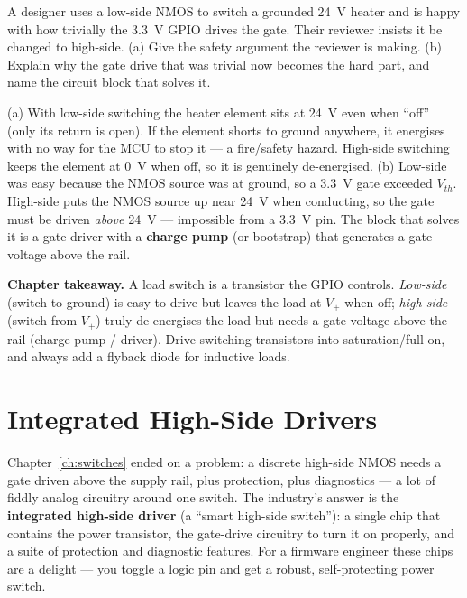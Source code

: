 \documentclass[11pt,a4paper,oneside]{book}
\begin{document}
\begin{exercise}
A designer uses a low-side NMOS to switch a grounded \qty{24}{\volt} heater and
is happy with how trivially the \qty{3.3}{\volt} GPIO drives the gate. Their
reviewer insists it be changed to high-side. (a) Give the safety argument the
reviewer is making. (b) Explain why the gate drive that was trivial now becomes
the hard part, and name the circuit block that solves it.
\end{exercise}
\begin{solution}
(a) With low-side switching the heater element sits at \qty{24}{\volt} even when
``off'' (only its return is open). If the element shorts to ground anywhere, it
energises with no way for the MCU to stop it --- a fire/safety hazard. High-side
switching keeps the element at \qty{0}{\volt} when off, so it is genuinely
de-energised. (b) Low-side was easy because the NMOS source was at ground, so a
\qty{3.3}{\volt} gate exceeded $V_{th}$. High-side puts the NMOS source up near
\qty{24}{\volt} when conducting, so the gate must be driven \emph{above}
\qty{24}{\volt} --- impossible from a \qty{3.3}{\volt} pin. The block that solves
it is a gate driver with a \textbf{charge pump} (or bootstrap) that generates a
gate voltage above the rail.
\end{solution}

\begin{keyidea}
\textbf{Chapter takeaway.} A load switch is a transistor the GPIO controls.
\emph{Low-side} (switch to ground) is easy to drive but leaves the load at $V_+$
when off; \emph{high-side} (switch from $V_+$) truly de-energises the load but
needs a gate voltage above the rail (charge pump / driver). Drive switching
transistors into saturation/full-on, and always add a flyback diode for inductive
loads.
\end{keyidea}

\chapter{Integrated High-Side Drivers}
\label{ch:hsdriver}

Chapter~\ref{ch:switches} ended on a problem: a discrete high-side NMOS needs a
gate driven above the supply rail, plus protection, plus diagnostics --- a lot of
fiddly analog circuitry around one switch. The industry's answer is the
\textbf{integrated high-side driver} (a ``smart high-side switch''): a single chip
that contains the power transistor, the gate-drive circuitry to turn it on
properly, and a suite of protection and diagnostic features. For a firmware
engineer these chips are a delight --- you toggle a logic pin and get a robust,
self-protecting power switch.
\end{document}

